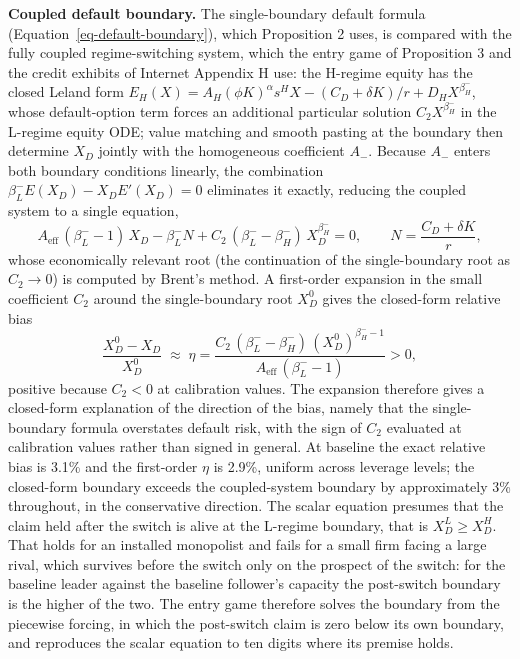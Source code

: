 \documentclass[
  11pt,
  letterpaper,
]{scrartcl}
\begin{document}
\textbf{Coupled default boundary.} The single-boundary default formula
(Equation~\ref{eq-default-boundary}), which Proposition 2 uses, is
compared with the fully coupled regime-switching system, which the entry
game of Proposition 3 and the credit exhibits of Internet Appendix H
use: the H-regime equity has the closed Leland form
\(E_H(X) = A_H(\phi K)^\alpha s^H X - (C_D + \delta K)/r + D_H X^{\beta_H^-}\),
whose default-option term forces an additional particular solution
\(C_2 X^{\beta_H^-}\) in the L-regime equity ODE; value matching and
smooth pasting at the boundary then determine \(X_D\) jointly with the
homogeneous coefficient \(A_-\). Because \(A_-\) enters both boundary
conditions linearly, the combination
\(\beta_L^- E(X_D) - X_D E'(X_D) = 0\) eliminates it exactly, reducing
the coupled system to a single equation, \[
A_{\text{eff}}\,(\beta_L^- - 1)\,X_D - \beta_L^- N + C_2\,(\beta_L^- - \beta_H^-)\,X_D^{\beta_H^-} = 0, \qquad N = \frac{C_D + \delta K}{r},
\] whose economically relevant root (the continuation of the
single-boundary root as \(C_2 \to 0\)) is computed by Brent's method. A
first-order expansion in the small coefficient \(C_2\) around the
single-boundary root \(X_D^0\) gives the closed-form relative bias \[
\frac{X_D^0 - X_D}{X_D^0} \;\approx\; \eta = \frac{C_2\,(\beta_L^- - \beta_H^-)\,(X_D^0)^{\beta_H^- - 1}}{A_{\text{eff}}\,(\beta_L^- - 1)} > 0,
\] positive because \(C_2 < 0\) at calibration values. The expansion
therefore gives a closed-form explanation of the direction of the bias,
namely that the single-boundary formula overstates default risk, with
the sign of \(C_2\) evaluated at calibration values rather than signed
in general. At baseline the exact relative bias is 3.1\% and the
first-order \(\eta\) is 2.9\%, uniform across leverage levels; the
closed-form boundary exceeds the coupled-system boundary by
approximately 3\% throughout, in the conservative direction. The scalar
equation presumes that the claim held after the switch is alive at the
L-regime boundary, that is \(X_D^L \geq X_D^H\). That holds for an
installed monopolist and fails for a small firm facing a large rival,
which survives before the switch only on the prospect of the switch: for
the baseline leader against the baseline follower's capacity the
post-switch boundary is the higher of the two. The entry game therefore
solves the boundary from the piecewise forcing, in which the post-switch
claim is zero below its own boundary, and reproduces the scalar equation
to ten digits where its premise holds.
\end{document}
